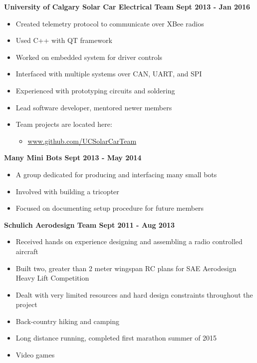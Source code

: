 \documentclass[12pt]{article}
\begin{document}
\bigskip
{}
\medskip

\noindent \centerline{\bf University of Calgary Solar Car Electrical Team \hfill Sept 2013 - Jan 2016}
\begin{itemize}
  \item Created telemetry protocol to communicate over XBee radios
  \item Used C++ with QT framework
  \item Worked on embedded system for driver controls
  \item Interfaced with multiple systems over CAN, UART, and SPI
  \item Experienced with prototyping circuits and soldering
  \item Lead software developer, mentored newer members
  \item Team projects are located here:
\begin{itemize}
  \item \url{www.github.com/UCSolarCarTeam}
\end{itemize}
\end{itemize}

\noindent \centerline{\bf Many Mini Bots \hfill Sept 2013 - May 2014}
\begin{itemize}
  \item A group dedicated for producing and interfacing many small bots
  \item Involved with building a tricopter
  \item Focused on documenting setup procedure for future members
\end{itemize}

\noindent \centerline{ \bf Schulich Aerodesign Team \hfill Sept 2011 - Aug 2013}
\begin{itemize}
  \item Received hands on experience  designing and assembling a radio controlled aircraft
  \item Built two, greater than 2 meter wingspan RC plans for SAE Aerodesign Heavy Lift Competition
  \item Dealt with very limited resources and hard design constraints throughout the project
\end{itemize}

\bigskip
{}
\medskip

\begin{itemize}
\item Back-country hiking and camping
\item Long distance running, completed first marathon summer of 2015
\item Video games
\end{itemize}
\bigskip
\end{document}
